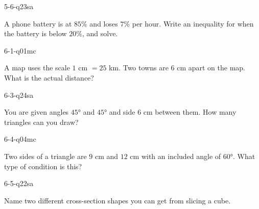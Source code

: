 \begin{practiceQuestion}{5-6-q23}{sa}
\begin{questionText}
A phone battery is at $85\%$ and loses $7\%$ per hour. Write an inequality for when the battery is below $20\%$, and solve.
\end{questionText}
\end{practiceQuestion}

\begin{practiceQuestion}{6-1-q01}{mc}
\begin{questionText}
A map uses the scale $1$ cm $= 25$ km. Two towns are $6$ cm apart on the map. What is the actual distance?
\end{questionText}
\end{practiceQuestion}

\begin{practiceQuestion}{6-3-q24}{sa}
\begin{questionText}
You are given angles $45°$ and $45°$ and side $6$ cm between them. How many triangles can you draw?
\end{questionText}
\end{practiceQuestion}

\begin{practiceQuestion}{6-4-q04}{mc}
\begin{questionText}
Two sides of a triangle are $9$ cm and $12$ cm with an included angle of $60°$. What type of condition is this?
\end{questionText}
\end{practiceQuestion}

\begin{practiceQuestion}{6-5-q22}{sa}
\begin{questionText}
Name two different cross-section shapes you can get from slicing a cube.
\end{questionText}
\end{practiceQuestion}

